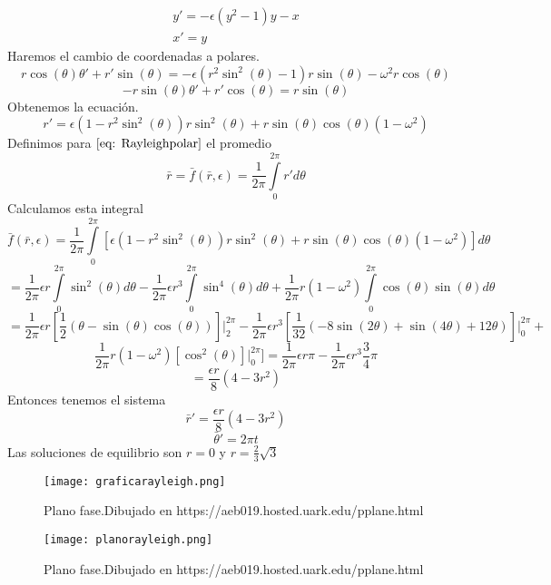 \begin{equation}\label{eq: Rayleigh}
	\begin{matrix}
		y'=-\epsilon(y^2-1)y-x \\
		x'=y
	\end{matrix}
\end{equation}
Haremos el cambio de coordenadas a polares.
$$r\cos(\theta)\theta'+r'\sin(\theta)=-\epsilon (r^2\sin^2(\theta)-1)r\sin(\theta)-\omega^2r\cos(\theta) $$
$$-r\sin(\theta)\theta'+r'\cos(\theta)=r\sin(\theta)$$
Obtenemos la ecuación.
\begin{equation}\label{eq: Rayleighpolar}
	r'=\epsilon(1-r^2\sin^2(\theta))r\sin^2(\theta)+r\sin(\theta)\cos(\theta)(1-\omega^2)
\end{equation}
Definimos para $\eqref{eq: Rayleighpolar}$ el promedio
$$\bar{r}=\bar{f}(\bar{r},\epsilon)=\frac{1}{2\pi}\int\limits_0^{2\pi}r'd\theta$$
Calculamos esta integral
$$\bar{f}(\bar{r},\epsilon)=\frac{1}{2\pi}\int\limits_0^{2\pi}[\epsilon(1-r^2\sin^2(\theta))r\sin^2(\theta)+r\sin(\theta)\cos(\theta)(1-\omega^2)]d\theta$$
$$=\frac{1}{2\pi}\epsilon r\int\limits_0^{2\pi}\sin^2(\theta)d\theta-\frac{1}{2\pi}\epsilon r^3\int\limits_0^{2\pi}\sin^4(\theta)d\theta+\frac{1}{2\pi}r(1-\omega^2)\int\limits_0^{2\pi}\cos(\theta)\sin(\theta)d\theta$$
$$=\frac{1}{2\pi}\epsilon r[\frac{1}{2}(\theta-\sin(\theta)\cos(\theta))]\Big|_2^{2\pi}-\frac{1}{2\pi}\epsilon r^3[\frac{1}{32}(-8\sin(2\theta)+\sin(4\theta)+12\theta)]\Big|_0^{2\pi}+$$
$$\frac{1}{2\pi}r(1-\omega^2)[\cos^2(\theta)]\Big|_0^{2\pi}]=\frac{1}{2\pi}\epsilon r\pi-\frac{1}{2\pi}\epsilon r^3\frac{3}{4}\pi$$
$$=\frac{\epsilon r}{8}(4-3r^2)$$
Entonces tenemos el sistema
$$\bar{r}'=\frac{\epsilon r}{8}(4-3r^2)$$
$$\bar{\theta}'=2\pi t$$
Las soluciones de equilibrio son $r=0$ y $r=\frac{2}{3}\sqrt{3}$
\begin{figure}[h]
	\centering
	\texttt{[image: graficarayleigh.png]}
	\caption{Plano fase.Dibujado en https://aeb019.hosted.uark.edu/pplane.html}
\end{figure}
\begin{figure}[h]
	\centering
	\texttt{[image: planorayleigh.png]}
	\caption{Plano fase.Dibujado en https://aeb019.hosted.uark.edu/pplane.html}
\end{figure}
